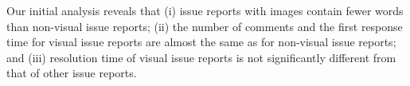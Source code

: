 Our initial analysis reveals that (i) issue reports with images contain fewer words than non-visual issue reports; 
(ii) the number of comments and the first response time for visual issue reports are almost the same as for non-visual issue reports; 
and (iii) resolution time of visual issue reports is not significantly different from that of other issue reports. 
